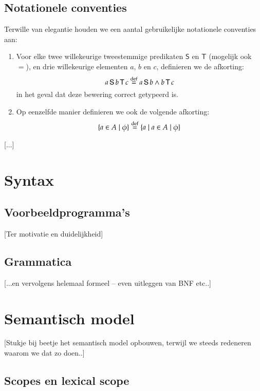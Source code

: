 \documentclass
  [11pt,
   paper=a4,
   cleardouble=plain,
   chapterprefix=true,
   parskip=half,
   draft=true]
  {scrbook}
\newcommand{\<}
  {\ensuremath{\langle}}
\renewcommand{\>}
  {\ensuremath{\rangle}}
\begin{document}
\section{Notationele conventies}

Terwille van elegantie houden we een aantal gebruikelijke notationele conventies aan:

\begin{enumerate}
	\item Voor elke twee willekeurige tweestemmige predikaten $\mathsf{S}$ en $\mathsf{T}$ (mogelijk ook $=$), en drie willekeurige elementen $a$, $b$ en $c$, definieren we de afkorting: $$a \operatorname{\mathsf{S}} b \operatorname{\mathsf{T}} c \buildrel{\mathrm{def}}\over{=} a \operatorname{\mathsf{S}} b \land b \operatorname{\mathsf{T}} c$$ in het geval dat deze bewering correct getypeerd is.
	\item Op eenzelfde manier definieren we ook de volgende afkorting: $$ \{a \in A \mid \phi \} \buildrel{\mathrm{def}}\over{=} \{a \mid a \in A \mid \phi\}$$
\end{enumerate}

[...]

\chapter{Syntax}

\section{Voorbeeldprogramma's}

[Ter motivatie en duidelijkheid]

\section{Grammatica}

[...en vervolgens helemaal formeel -- even uitleggen van BNF etc..]

\chapter{Semantisch model}

[Stukje bij beetje het semantisch model opbouwen, terwijl we steeds redeneren waarom we dat zo doen..]

\section{Scopes en lexical scope}
\end{document}
